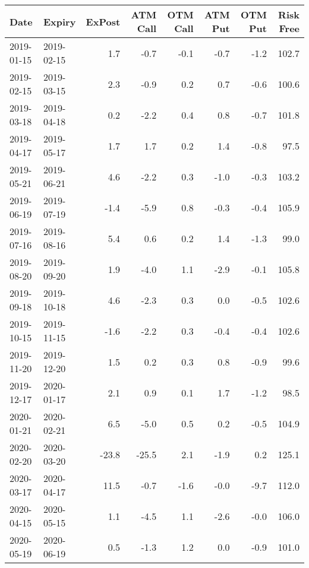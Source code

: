 \begin{tabular}{llrrrrrr}
\hline
 Date       & Expiry     &   ExPost &   ATM Call &   OTM Call &   ATM Put &   OTM Put &   Risk Free \\
\hline
 2019-01-15 & 2019-02-15 &      1.7 &       -0.7 &       -0.1 &      -0.7 &      -1.2 &       102.7 \\
 2019-02-15 & 2019-03-15 &      2.3 &       -0.9 &        0.2 &       0.7 &      -0.6 &       100.6 \\
 2019-03-18 & 2019-04-18 &      0.2 &       -2.2 &        0.4 &       0.8 &      -0.7 &       101.8 \\
 2019-04-17 & 2019-05-17 &      1.7 &        1.7 &        0.2 &       1.4 &      -0.8 &        97.5 \\
 2019-05-21 & 2019-06-21 &      4.6 &       -2.2 &        0.3 &      -1.0 &      -0.3 &       103.2 \\
 2019-06-19 & 2019-07-19 &     -1.4 &       -5.9 &        0.8 &      -0.3 &      -0.4 &       105.9 \\
 2019-07-16 & 2019-08-16 &      5.4 &        0.6 &        0.2 &       1.4 &      -1.3 &        99.0 \\
 2019-08-20 & 2019-09-20 &      1.9 &       -4.0 &        1.1 &      -2.9 &      -0.1 &       105.8 \\
 2019-09-18 & 2019-10-18 &      4.6 &       -2.3 &        0.3 &       0.0 &      -0.5 &       102.6 \\
 2019-10-15 & 2019-11-15 &     -1.6 &       -2.2 &        0.3 &      -0.4 &      -0.4 &       102.6 \\
 2019-11-20 & 2019-12-20 &      1.5 &        0.2 &        0.3 &       0.8 &      -0.9 &        99.6 \\
 2019-12-17 & 2020-01-17 &      2.1 &        0.9 &        0.1 &       1.7 &      -1.2 &        98.5 \\
 2020-01-21 & 2020-02-21 &      6.5 &       -5.0 &        0.5 &       0.2 &      -0.5 &       104.9 \\
 2020-02-20 & 2020-03-20 &    -23.8 &      -25.5 &        2.1 &      -1.9 &       0.2 &       125.1 \\
 2020-03-17 & 2020-04-17 &     11.5 &       -0.7 &       -1.6 &      -0.0 &      -9.7 &       112.0 \\
 2020-04-15 & 2020-05-15 &      1.1 &       -4.5 &        1.1 &      -2.6 &      -0.0 &       106.0 \\
 2020-05-19 & 2020-06-19 &      0.5 &       -1.3 &        1.2 &       0.0 &      -0.9 &       101.0 \\

\end{tabular}

